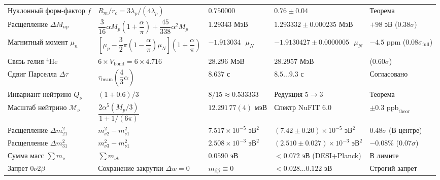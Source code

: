 \documentclass[11pt,a4paper]{article}
\theoremstyle{definition}
\theoremstyle{remark}
\begin{document}
\begin{xltabular}{\textwidth}{
>{\raggedright\arraybackslash}p{3.8cm}
>{\centering\arraybackslash}X
>{\centering\arraybackslash}p{2.7cm}
>{\centering\arraybackslash}p{2.8cm}
>{\centering\arraybackslash}p{2.0cm}
}
Нуклонный форм-фактор $f$ & $R_m / r_c = 3\lambda_p / (4\lambda_p)$ & $0.750000$ & $0.76 \pm 0.04$ & Теорема \\

Расщепление $\Delta M_{np}$ & $\dfrac{3}{16}\alpha M_p \left(1 + \dfrac{\alpha}{\pi}\right) + \dfrac{45}{338}\alpha^2 M_p$ & $1.29343\text{ МэВ}$ & $1.293332 \pm 0.000235\text{ МэВ}$ & $+98\text{ эВ}$ ($0.38\sigma$) \\

Магнитный момент $\mu_n$ & $\left[\mu_p - \dfrac{3}{2}\pi\left(1 - \dfrac{\alpha}{\pi}\right)\mu_N\right]\left(1 + \dfrac{\alpha}{\pi}\right)$ & $-1.913034\text{ }\mu_N$ & $-1.9130427 \pm 0.0000005\text{ }\mu_N$ & $-4.5\text{ ppm}$ ($0.08\sigma_{\mathrm{full}}$) \\

Связь гелия $^4\mathrm{He}$ & $6 \times V_{\mathrm{bond}} = 6 \times 4.716$ & $28.296\text{ МэВ}$ & $28.2957\text{ МэВ}$ & ($0.60\sigma$) \\

Сдвиг Парселла $\Delta\tau$ & $\tau_{\mathrm{beam}}\left(\dfrac{4}{3}\alpha\right)$ & $8.637\text{ с}$ & $8.5\dots 9.3\text{ с}$ & Согласовано \\

Инвариант нейтрино $Q_\nu$ & $(1 + 0.6) / 3$ & $8/15 \approx 0.533333$ & Редукция $5 \to 3$ & Теорема \\

Масштаб нейтрино $\mathcal{M}_\nu$ & $\dfrac{2\alpha^5(M_p/3)}{1 + 1/(6\pi)}$ & $12.291\,77(4)\text{ мэВ}$ & Спектр NuFIT 6.0 & $\pm 0.3\text{ ppb}_{\mathrm{theor}}$ \\

Расщепление $\Delta m_{21}^2$ & $m_{\nu 2}^2 - m_{\nu 1}^2$ & $7.517 \times 10^{-5}\text{ эВ}^2$ & $(7.42 \pm 0.20)\times 10^{-5}\text{ эВ}^2$ & $0.48\sigma$ (В центре) \\

Расщепление $\Delta m_{31}^2$ & $m_{\nu 3}^2 - m_{\nu 1}^2$ & $2.508 \times 10^{-3}\text{ эВ}^2$ & $(2.510 \pm 0.027)\times 10^{-3}\text{ эВ}^2$ & $-0.08\%$ ($0.07\sigma$) \\

Сумма масс $\sum m_\nu$ & $\sum m_{\nu k}$ & $0.0590\text{ эВ}$ & $< 0.072\text{ эВ}$ (DESI+Planck) & В лимите \\

Запрет $0\nu 2\beta$ & Сохранение закрутки $\Delta w = 0$ & $m_{\beta\beta} \equiv 0$ & $< 0.028\dots 0.122\text{ эВ}$ & Строгий запрет \\


\end{xltabular}
\end{document}
